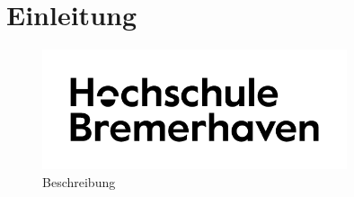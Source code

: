 \section{Einleitung}\label{einleitung}
\Blindtext
\FloatBarrier
\begin{figure}[!ht]
 \centering
 \includegraphics[width=0.8\textwidth]{src/abbildungen/logo.png}
  \caption[Beschreibung]{Beschreibung~\autocite[S.14]{mf2005}}
\label{fig:Beschreibung}
\end{figure}
\FloatBarrier
\Blindtext

